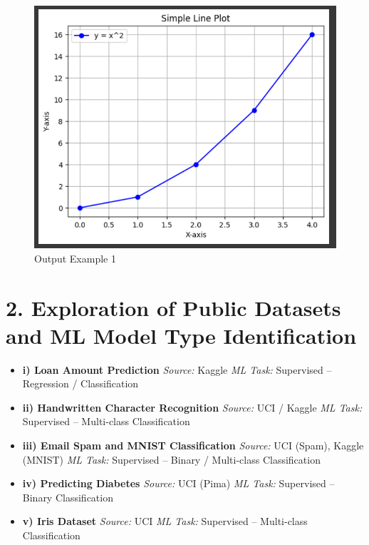 \documentclass[11pt]{article}
\begin{document}
\begin{figure}[H]
    \centering
    \includegraphics[width=0.8\linewidth]{ml5.png}
    \caption{Output Example 1}
    \label{fig:output1}
\end{figure}

\vspace{0.5cm}
\section*{2. Exploration of Public Datasets and ML Model Type Identification}

\begin{itemize}
    \item \textbf{i) Loan Amount Prediction}  
    \textit{Source:} Kaggle  
    \textit{ML Task:} Supervised – Regression / Classification
    
    \item \textbf{ii) Handwritten Character Recognition}  
    \textit{Source:} UCI / Kaggle  
    \textit{ML Task:} Supervised – Multi-class Classification

    \item \textbf{iii) Email Spam and MNIST Classification}  
    \textit{Source:} UCI (Spam), Kaggle (MNIST)  
    \textit{ML Task:} Supervised – Binary / Multi-class Classification

    \item \textbf{iv) Predicting Diabetes}  
    \textit{Source:} UCI (Pima)  
    \textit{ML Task:} Supervised – Binary Classification

    \item \textbf{v) Iris Dataset}  
    \textit{Source:} UCI  
    \textit{ML Task:} Supervised – Multi-class Classification
\end{itemize}
\end{document}
